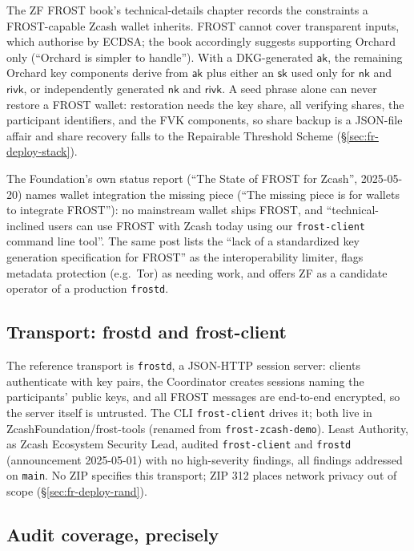\documentclass[11pt,a4paper]{article}
\theoremstyle{definition}
\newcommand{\aksym}{\ensuremath{\mathsf{ak}}}
\newcommand{\nksym}{\ensuremath{\mathsf{nk}}}
\begin{document}
The ZF FROST book's technical-details chapter records the constraints a
FROST-capable Zcash wallet inherits. FROST cannot cover transparent
inputs, which authorise by ECDSA; the book accordingly suggests supporting
Orchard only (``Orchard is simpler to handle''). With a DKG-generated
$\aksym$, the remaining Orchard key components derive from $\aksym$ plus
either an $\mathsf{sk}$ used only for $\nksym$ and $\mathsf{rivk}$, or
independently generated $\nksym$ and $\mathsf{rivk}$. A seed phrase alone
can never restore a FROST wallet: restoration needs the key share, all
verifying shares, the participant identifiers, and the FVK components, so
share backup is a JSON-file affair and share recovery falls to the
Repairable Threshold Scheme (\S\ref{sec:fr-deploy-stack}).

The Foundation's own status report (``The State of FROST for Zcash'',
2025-05-20) names wallet integration the missing piece (``The missing
piece is for wallets to integrate FROST''): no
mainstream wallet ships FROST, and ``technical-inclined users can use
FROST with Zcash today using our \texttt{frost-client} command line
tool''. The same post lists the ``lack of a standardized key generation
specification for FROST'' as the interoperability limiter, flags metadata
protection (e.g.\ Tor) as needing work, and offers ZF as a candidate
operator of a production \texttt{frostd}.

\subsection{Transport: frostd and frost-client}
\label{sec:fr-deploy-transport}

The reference transport is \texttt{frostd}, a JSON-HTTP session server:
clients authenticate with key pairs, the Coordinator creates sessions
naming the participants' public keys, and all FROST messages are
end-to-end encrypted, so the server itself is untrusted. The CLI
\texttt{frost-client} drives it; both live in
ZcashFoundation/\allowbreak frost-tools (renamed from
\texttt{frost-zcash-demo}). Least Authority, as Zcash Ecosystem Security
Lead, audited \texttt{frost-client} and \texttt{frostd} (announcement
2025-05-01) with no
high-severity findings, all findings addressed on \texttt{main}. No ZIP
specifies this transport; ZIP 312 places network privacy out of scope
(\S\ref{sec:fr-deploy-rand}).

\subsection{Audit coverage, precisely}\label{sec:fr-deploy-audit}
\end{document}
